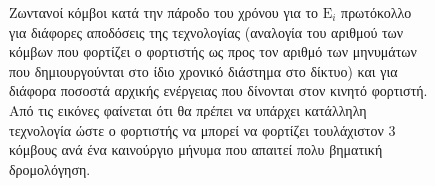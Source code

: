 \begin{figure}[H]
  \centering
  \caption{Ζωντανοί κόμβοι κατά την πάροδο του χρόνου για το $\text{E}_{i}$ πρωτόκολλο για διάφορες αποδόσεις της τεχνολογίας (αναλογία του αριθμού των κόμβων που
φορτίζει ο φορτιστής ως προς τον αριθμό των μηνυμάτων που δημιουργούνται στο ίδιο χρονικό διάστημα στο δίκτυο) και για διάφορα ποσοστά αρχικής ενέργειας που δίνονται
στον κινητό φορτιστή. Από τις εικόνες φαίνεται ότι θα πρέπει να υπάρχει κατάλληλη τεχνολογία ώστε ο φορτιστής να μπορεί να φορτίζει τουλάχιστον 3 κόμβους ανά ένα
καινούργιο μήνυμα που απαιτεί πολυ βηματική δρομολόγηση.}
  \label{fig:1exp_3_1}
\end{figure}





